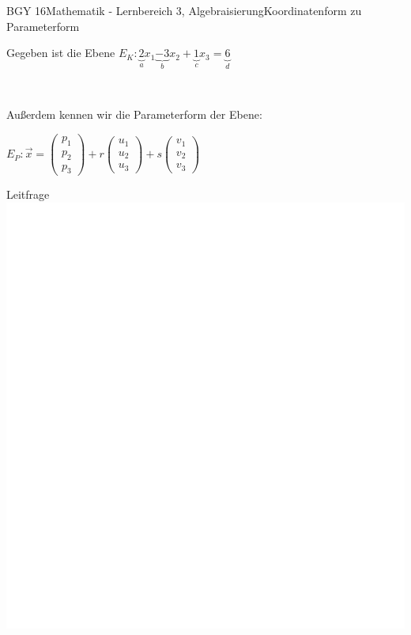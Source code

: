 \documentclass[oneside,openany,headings=optiontotoc,11pt,numbers=noenddot]{scrreprt}
\begin{document}
	\begin{worksheet}{BGY 16}{Mathematik - Lernbereich 3, Algebraisierung}{Koordinatenform zu Parameterform}
				
		\begin{framed}
			\noindent
			Gegeben ist die Ebene \(E_K: \underbrace{2}_{a}x_1\underbrace{-3}_{b}x_2+\underbrace{1}_{c}x_3 = \underbrace{6}_{d}\)\\
			\par
			\raggedleft
			\\
			\raggedright
			\par\bigskip\noindent
			Außerdem kennen wir die Parameterform der Ebene: \\
			\par\bigskip\noindent
			\(E_P: \vec{x} = \left(\begin{array}{c}p_1\\p_2\\p_3\end{array}\right) + r\left(\begin{array}{c}u_1\\u_2\\u_3\end{array}\right) + s\left(\begin{array}{c}v_1\\v_2\\v_3\end{array}\right)\)
		\end{framed}
		\begin{framed}
			\tiny{\color{codegray}Leitfrage}\normalcolor\normalsize\\
			\includegraphics[scale=0.15]{../empty.jpg}

\end{framed}
\end{worksheet}
\end{document}
